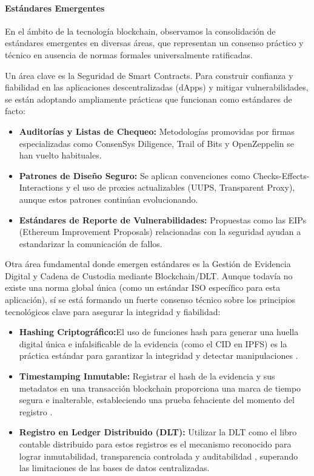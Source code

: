\documentclass[
    letterpaper, 
    man,   
    spanish,
    12pt,
    donotrepeattitle,
    floatsintext,
    hidelinks %
]{apa7}
\begin{document}
\paragraph{Estándares Emergentes} En el ámbito de la tecnología blockchain, observamos la consolidación de estándares emergentes en diversas áreas, que representan un consenso práctico y técnico en ausencia de normas formales universalmente ratificadas. 

Un área clave es la Seguridad de Smart Contracts. Para construir confianza y fiabilidad en las aplicaciones descentralizadas (dApps) y mitigar vulnerabilidades, se están adoptando ampliamente prácticas que funcionan como estándares de facto: 
\begin{itemize}
    \item \textbf{Auditorías y Listas de Chequeo:} Metodologías promovidas por firmas especializadas como ConsenSys Diligence, Trail of Bits y OpenZeppelin se han vuelto habituales. 
    \item \textbf{Patrones de Diseño Seguro:} Se aplican convenciones como Checks-Effects-Interactions y el uso de proxies actualizables (UUPS, Transparent Proxy), aunque estos patrones continúan evolucionando. 
    \item \textbf{Estándares de Reporte de Vulnerabilidades:} Propuestas como las EIPs (Ethereum Improvement Proposals) relacionadas con la seguridad ayudan a estandarizar la comunicación de fallos.
\end{itemize}

Otra área fundamental donde emergen estándares es la Gestión de Evidencia Digital y Cadena de Custodia mediante Blockchain/DLT. Aunque todavía no existe una norma global única (como un estándar ISO específico para esta aplicación), sí se está formando un fuerte consenso técnico sobre los principios tecnológicos clave para asegurar la integridad y fiabilidad:

\begin{itemize}
    \item \textbf{Hashing Criptográfico:}El uso de funciones hash para generar una huella digital única e infalsificable de la evidencia (como el CID en IPFS) es la práctica estándar para garantizar la integridad y detectar manipulaciones \parencite{benet2014ipfs}. 
    \item \textbf{Timestamping Inmutable:} Registrar el hash de la evidencia y sus metadatos en una transacción blockchain proporciona una marca de tiempo segura e inalterable, estableciendo una prueba fehaciente del momento del registro \parencite{nakamoto2008bitcoin}. 
    \item \textbf{Registro en Ledger Distribuido (DLT):} Utilizar la DLT como el libro contable distribuido para estos registros es el mecanismo reconocido para lograr inmutabilidad, transparencia controlada y auditabilidad \parencite{swan2015blockchain}, superando las limitaciones de las bases de datos centralizadas.
\end{itemize}
\end{document}
